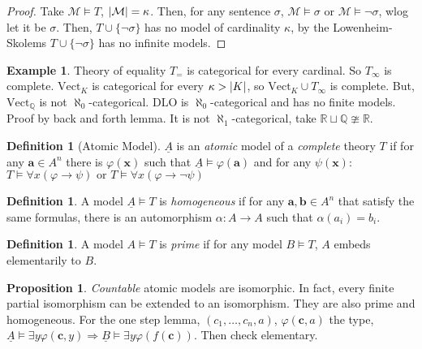 \documentclass[a4paper,10pt]{article}
\theoremstyle{definition}
\DeclarePairedDelimiter\abs{\lvert}{\rvert}
\newtheorem{definition}[theorem]{Definition}
\newtheorem{example}[theorem]{Example}
\newtheorem{proposition}[theorem]{Proposition}
\let\vec\mathbf
\let\phi\varphi
\let\implies\Rightarrow
\begin{document}
\begin{proof}
    Take $\mathcal{M} \models T$, $\abs{\mathcal{M}} = \kappa$. Then, for any sentence $\sigma$, $\mathcal{M} \models \sigma$ or $\mathcal{M} \models \neg \sigma$, wlog let it be $\sigma$. Then, $T \cup \{\neg \sigma\}$ has no model of cardinality $\kappa$, by the Lowenheim-Skolems $T \cup \{\neg \sigma\}$ has no infinite models.
\end{proof}


\begin{example}
        Theory of equality $T_=$ is categorical for every cardinal. So $T_{\infty}$ is complete.
         $\mathrm{Vect}_K$ is categorical for every $\kappa > \abs{K}$, so $\mathrm{Vect}_K \cup T_\infty$ is complete. But, $\mathrm{Vect}_\mathbb{Q}$ is not $\aleph_0$-categorical.
         $\mathrm{DLO}$ is $\aleph_0$-categorical and has no finite models. Proof by back and forth lemma. It is not $\aleph_1$-categorical, take $\mathbb{R} \sqcup \mathbb{Q} \ncong \mathbb{R}$.
\end{example}

\begin{definition}[Atomic Model]
    $\underline{A}$ is an \emph{atomic} model of a \emph{complete} theory $T$ if for any $\vec{a} \in A^n$ there is $\phi(\vec{x})$ such that $\underline{A} \models \phi(\vec{a})$ and for any $\psi(\vec{x})$:
$        T \vDash \forall x (\phi \rightarrow \psi) \text{ or } T \vDash \forall x (\phi \rightarrow \neg \psi)$
\end{definition}

\begin{definition}
    A model $\underline{A} \models T$ is \emph{homogeneous} if for any $\vec{a}, \vec{b} \in A^n$ that satisfy the same formulas, there is an automorphism $\alpha \colon A \longrightarrow A$ such that $\alpha(a_i) = b_i$.
\end{definition}

\begin{definition}
    A model $A \models T$ is \emph{prime} if for any model $B \models T$, $A$ embeds elementarily to $B$.
\end{definition}

\begin{proposition} 
    \emph{Countable} atomic models are isomorphic. In fact, every finite partial isomorphism can be extended to an isomorphism. They are also prime and homogeneous. For the one step lemma, $(c_1, \ldots, c_n, a)$, $\phi(\vec{c}, a)$ the type,  $\underline{A} \models \exists y \phi(\vec{c}, y) \implies \underline{B} \models \exists y \phi(f(\vec{c}))$. Then check elementary.
\end{proposition}
\end{document}
